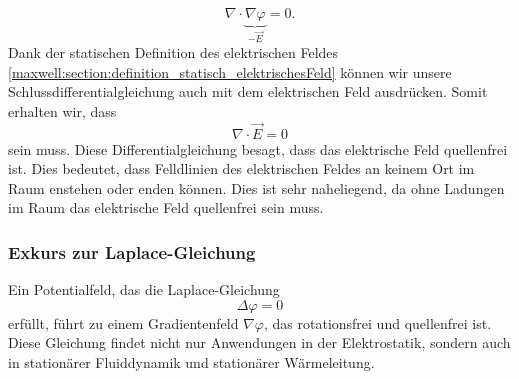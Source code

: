 \begin{equation}
\nabla\cdot\underbrace{\nabla\varphi}_{\displaystyle-\vec{E}}
=
0.
\label{maxwell:section:laplace_gleichung_3}
\end{equation}
Dank der statischen Definition des elektrischen Feldes \eqref{maxwell:section:definition_statisch_elektrischesFeld} können wir unsere Schlussdifferentialgleichung auch mit dem elektrischen Feld ausdrücken. Somit erhalten wir, dass
\begin{equation}
	\nabla\cdot\vec{E}
	=
	0
	\label{maxwell:section:e_feld_quellenfrei}
\end{equation}
sein muss. Diese Differentialgleichung besagt, dass das elektrische Feld quellenfrei ist.
Dies bedeutet, dass Felldlinien des elektrischen Feldes an keinem Ort im Raum enstehen oder enden können.
Dies ist sehr naheliegend, da ohne Ladungen im Raum das elektrische Feld quellenfrei sein muss.

\subsubsection{Exkurs zur Laplace-Gleichung}
\label{maxwell:section:laplacegleichung_exkurs}
Ein Potentialfeld, das die Laplace-Gleichung
\[
\Delta\varphi
=
0
\]
erfüllt, führt zu einem Gradientenfeld $\nabla\varphi$, das rotationsfrei und quellenfrei ist.
Diese Gleichung findet nicht nur Anwendungen in der Elektrostatik, sondern auch in stationärer Fluiddynamik und stationärer Wärmeleitung.






